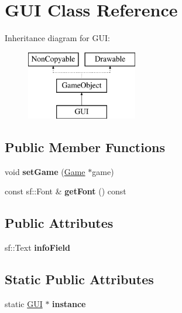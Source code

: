 \hypertarget{class_g_u_i}{\section{G\-U\-I Class Reference}
\label{class_g_u_i}
}
Inheritance diagram for G\-U\-I\-:\begin{figure}[H]
\begin{center}
\leavevmode
\includegraphics[height=3.000000cm]{class_g_u_i}
\end{center}
\end{figure}
\subsection*{Public Member Functions}
\begin{DoxyCompactItemize}
\item 
\hypertarget{class_g_u_i_afbedd68995919c50a7298de4735b77c6}{void {\bfseries set\-Game} (\hyperlink{class_game}{Game} $\ast$game)}\label{class_g_u_i_afbedd68995919c50a7298de4735b77c6}

\item 
\hypertarget{class_g_u_i_aa04da479a7d4af5cbf0e4a7d821026d8}{const sf\-::\-Font \& {\bfseries get\-Font} () const }\label{class_g_u_i_aa04da479a7d4af5cbf0e4a7d821026d8}

\end{DoxyCompactItemize}
\subsection*{Public Attributes}
\begin{DoxyCompactItemize}
\item 
\hypertarget{class_g_u_i_ac7d6f381a87bc0ac9644f3abd14bc5f0}{sf\-::\-Text {\bfseries info\-Field}}\label{class_g_u_i_ac7d6f381a87bc0ac9644f3abd14bc5f0}

\end{DoxyCompactItemize}
\subsection*{Static Public Attributes}
\begin{DoxyCompactItemize}
\item 
\hypertarget{class_g_u_i_a0df934366b2f996721ba92fd751ec873}{static \hyperlink{class_g_u_i}{G\-U\-I} $\ast$ {\bfseries instance}}\label{class_g_u_i_a0df934366b2f996721ba92fd751ec873}

\end{DoxyCompactItemize}

